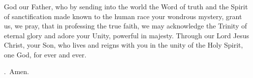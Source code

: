 \lettrine[lines=3]{G}{}od our Father, who by sending into the world
the Word of truth and the Spirit of sanctification
made known to the human race your wondrous mystery,
grant us, we pray, that in professing the true faith,
we may acknowledge the Trinity of eternal glory
and adore your Unity, powerful in majesty.
Through our Lord Jesus Christ, your Son,
who lives and reigns with you in the unity of the Holy Spirit,
one God, for ever and ever. \par \Rbar.~Amen.
